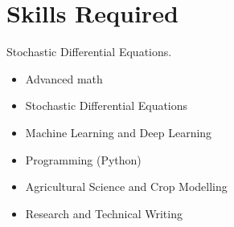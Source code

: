 \section*{Skills Required}
Stochastic Differential Equations.
\begin{itemize}
    \item Advanced math
    \item Stochastic Differential Equations
    \item Machine Learning and Deep Learning
    \item Programming (Python)
    \item Agricultural Science and Crop Modelling
    \item Research and Technical Writing
\end{itemize}